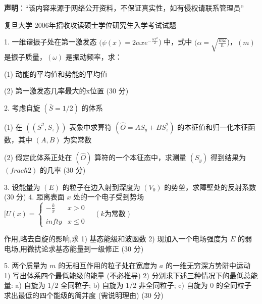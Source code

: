 

\begin{issues}
\issueTODO
\end{issues}

\textbf{声明}：“该内容来源于网络公开资料，不保证真实性，如有侵权请联系管理员”

复旦大学 2006年招收攻读硕士学位研究生入学考试试题

1. 一维谐振子处在第一激发态 $( \psi (x) = 2 \alpha x e^{-\frac{\alpha x^2}{2}} $) 中，式中 $( \alpha = \sqrt{\frac{m \omega}{\hbar}}$)，$( m )$ 是振子质量，$(\omega)$ 是振动频率，求：

(1) 动能的平均值和势能的平均值

(2) 第一激发态几率最大的x位置 (30 分)

2. 考虑自旋 $(\bar{S} = 1/2)$ 的体系

(1) 在 $((S^2, S_z))$ 表象中求算符 $(\hat{O} = A S_y + B S_z^2 )$ 的本征值和归一化本征函数，其中 $( A, B )$ 为实常数

(2) 假定此体系正处在 $(\hat{O})$ 算符的一个本征态中，求测量 $( S_y )$ 得到结果为 $(frac{\hbar}{2})$ 的几率 (30 分)

3. 设能量为 $( E )$ 的粒子在边入射到深度为 $( V_0 )$ 的势垒，求障壁处的反射系数 (30 分)
4. 距离表面 $x$ 处的一个电子受到势场
$[U(x) = \begin{cases} -\frac{k}{x} & x > 0 \\\ \\infty & x \leq 0 \end{cases} \quad (k \text{为常数})$

作用,略去自旋的影响,求
1) 基态能级和波函数 
2) 现加入一个电场强度为 $E$ 的弱电场,用微扰论求基态能量到一级修正 \hfill (30 分)

5. 两个质量为 $m$ 的无相互作用的粒子处在宽度为 $a$ 的一维无穷深方势阱中运动
1) 写出体系四个最低能级的能量 (不必推导) 
2) 分别求下述三种情况下的最低总能量: 
\quad a) 自旋为 $1/2$ 全同粒子; 
\quad b) 自旋为 $1/2$ 非全同粒子; 
\quad c) 自旋为 $0$ 的全同粒子 
求出最低的四个能级的简并度 (需说明理由) \hfill (30 分)
